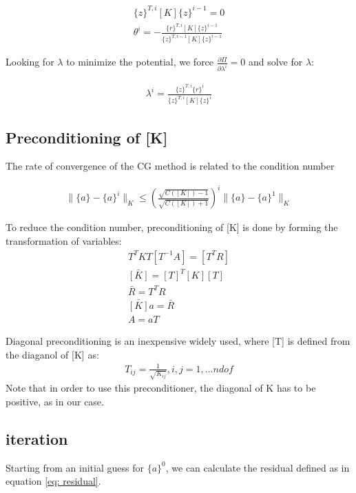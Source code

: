 \documentclass[paper=a4, fontsize=11pt]{article} %
\begin{document}
\begin{eqnarray}
\{z\}^{T, i} [K] \{z\} ^{i-1} =0 \nonumber\\
\theta^i = - \frac{\{r\}^{T,i} [K] \{z\} ^ {i-1}} {\{z\} ^{T,i-1} [K] \{z\}^{i-1} }
\end{eqnarray}

Looking for $\lambda$ to minimize the potential, we force $\frac{\partial {\Pi}}{\partial \lambda ^i} =0 $ and solve for $\lambda$:

\begin{eqnarray}
\lambda ^i = \frac{ \{z\}^{T,i} \{r\}^i} { \{z\}^{T,i}[K]\{z\}^i}
\end{eqnarray}

\subsection{Preconditioning of [K]}
The rate of convergence of the CG method is related to the condition number

\begin{eqnarray}
\| \{a\} - \{ a\}^i \| _K \leq (\frac{ \sqrt{C([K]) -1} }{ \sqrt{C([K]) + 1} }) ^i \| \{a\} - \{a\} ^1 \| _K
\end{eqnarray}

To reduce the condition number, preconditioning of [K] is done by forming the transformation of variables:
\begin{eqnarray}
T^{T}KT  [T^{-1} A] = [T^T R] \nonumber\\
\bar{[K]} = [T] ^T [K] [T] \nonumber\\
\bar{R} = T^T R \nonumber\\
\bar{[K]}a = \bar{R} \nonumber\\
A = aT 
\end{eqnarray} 

Diagonal preconditioning is an inexpensive widely used, where [T] is defined from the diaganol of [K] as:
\begin{eqnarray}
T_{ij} = \frac{1} { \sqrt{ K_{ij} } }, i,j = 1, ... ndof 
\end{eqnarray}
Note that in order to use this preconditioner, the diagonal of K has to be positive, as in our case.

\subsection{iteration}
Starting from an initial guess for $\{a\}^0$, we can calculate the residual defined as in equation \ref{eq: residual}.
\end{document}
